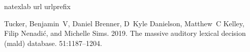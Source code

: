 \documentclass{article}\usepackage[]{graphicx}\usepackage[]{color}
\begin{document}
\begin{thebibliography}{1}
\expandafter\ifx\csname natexlab\endcsname\relax\def\natexlab#1{#1}\fi
\expandafter\ifx\csname url\endcsname\relax
  \def\url#1{{\tt #1}}\fi
\expandafter\ifx\csname urlprefix\endcsname\relax\def\urlprefix{URL }\fi

Tucker, Benjamin~V, Daniel Brenner, D~Kyle Danielson, Matthew~C Kelley, Filip
  Nenadi{\'c}, and Michelle Sims. 2019.
\newblock The massive auditory lexical decision (mald) database.
 51:1187--1204.

\end{thebibliography}
\end{document}
